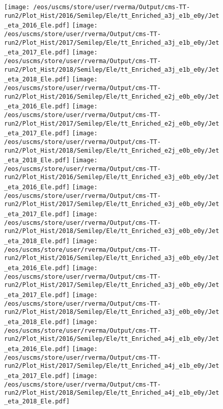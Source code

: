 \begin{figure}
\centering
\texttt{[image: /eos/uscms/store/user/rverma/Output/cms-TT-run2/Plot\_Hist/2016/Semilep/Ele/tt\_Enriched\_a3j\_e1b\_e0y/Jet\_eta\_2016\_Ele.pdf]}
\texttt{[image: /eos/uscms/store/user/rverma/Output/cms-TT-run2/Plot\_Hist/2017/Semilep/Ele/tt\_Enriched\_a3j\_e1b\_e0y/Jet\_eta\_2017\_Ele.pdf]}
\texttt{[image: /eos/uscms/store/user/rverma/Output/cms-TT-run2/Plot\_Hist/2018/Semilep/Ele/tt\_Enriched\_a3j\_e1b\_e0y/Jet\_eta\_2018\_Ele.pdf]}
\texttt{[image: /eos/uscms/store/user/rverma/Output/cms-TT-run2/Plot\_Hist/2016/Semilep/Ele/tt\_Enriched\_e2j\_e0b\_e0y/Jet\_eta\_2016\_Ele.pdf]}
\texttt{[image: /eos/uscms/store/user/rverma/Output/cms-TT-run2/Plot\_Hist/2017/Semilep/Ele/tt\_Enriched\_e2j\_e0b\_e0y/Jet\_eta\_2017\_Ele.pdf]}
\texttt{[image: /eos/uscms/store/user/rverma/Output/cms-TT-run2/Plot\_Hist/2018/Semilep/Ele/tt\_Enriched\_e2j\_e0b\_e0y/Jet\_eta\_2018\_Ele.pdf]}
\texttt{[image: /eos/uscms/store/user/rverma/Output/cms-TT-run2/Plot\_Hist/2016/Semilep/Ele/tt\_Enriched\_e3j\_e0b\_e0y/Jet\_eta\_2016\_Ele.pdf]}
\texttt{[image: /eos/uscms/store/user/rverma/Output/cms-TT-run2/Plot\_Hist/2017/Semilep/Ele/tt\_Enriched\_e3j\_e0b\_e0y/Jet\_eta\_2017\_Ele.pdf]}
\texttt{[image: /eos/uscms/store/user/rverma/Output/cms-TT-run2/Plot\_Hist/2018/Semilep/Ele/tt\_Enriched\_e3j\_e0b\_e0y/Jet\_eta\_2018\_Ele.pdf]}
\texttt{[image: /eos/uscms/store/user/rverma/Output/cms-TT-run2/Plot\_Hist/2016/Semilep/Ele/tt\_Enriched\_a3j\_e0b\_e0y/Jet\_eta\_2016\_Ele.pdf]}
\texttt{[image: /eos/uscms/store/user/rverma/Output/cms-TT-run2/Plot\_Hist/2017/Semilep/Ele/tt\_Enriched\_a3j\_e0b\_e0y/Jet\_eta\_2017\_Ele.pdf]}
\texttt{[image: /eos/uscms/store/user/rverma/Output/cms-TT-run2/Plot\_Hist/2018/Semilep/Ele/tt\_Enriched\_a3j\_e0b\_e0y/Jet\_eta\_2018\_Ele.pdf]}
\texttt{[image: /eos/uscms/store/user/rverma/Output/cms-TT-run2/Plot\_Hist/2016/Semilep/Ele/tt\_Enriched\_a4j\_e1b\_e0y/Jet\_eta\_2016\_Ele.pdf]}
\texttt{[image: /eos/uscms/store/user/rverma/Output/cms-TT-run2/Plot\_Hist/2017/Semilep/Ele/tt\_Enriched\_a4j\_e1b\_e0y/Jet\_eta\_2017\_Ele.pdf]}
\texttt{[image: /eos/uscms/store/user/rverma/Output/cms-TT-run2/Plot\_Hist/2018/Semilep/Ele/tt\_Enriched\_a4j\_e1b\_e0y/Jet\_eta\_2018\_Ele.pdf]}
\end{figure}

